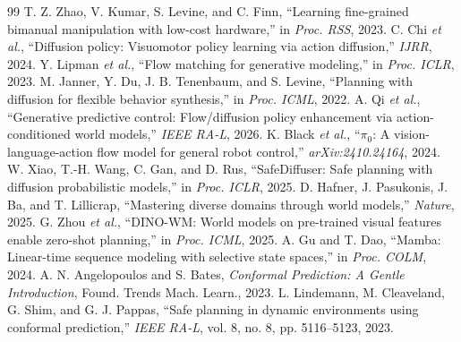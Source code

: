\documentclass[letterpaper, 10pt, conference]{ieeeconf}
\begin{document}
\begin{thebibliography}{99}
 T. Z. Zhao, V. Kumar, S. Levine, and C. Finn, ``Learning fine-grained bimanual manipulation with low-cost hardware,'' in \textit{Proc. RSS}, 2023.
 C. Chi \textit{et al.}, ``Diffusion policy: Visuomotor policy learning via action diffusion,'' \textit{IJRR}, 2024.
 Y. Lipman \textit{et al.}, ``Flow matching for generative modeling,'' in \textit{Proc. ICLR}, 2023.
 M. Janner, Y. Du, J. B. Tenenbaum, and S. Levine, ``Planning with diffusion for flexible behavior synthesis,'' in \textit{Proc. ICML}, 2022.
 A. Qi \textit{et al.}, ``Generative predictive control: Flow/diffusion policy enhancement via action-conditioned world models,'' \textit{IEEE RA-L}, 2026.
 K. Black \textit{et al.}, ``$\pi_0$: A vision-language-action flow model for general robot control,'' \textit{arXiv:2410.24164}, 2024.
 W. Xiao, T.-H. Wang, C. Gan, and D. Rus, ``SafeDiffuser: Safe planning with diffusion probabilistic models,'' in \textit{Proc. ICLR}, 2025.
 D. Hafner, J. Pasukonis, J. Ba, and T. Lillicrap, ``Mastering diverse domains through world models,'' \textit{Nature}, 2025.
 G. Zhou \textit{et al.}, ``DINO-WM: World models on pre-trained visual features enable zero-shot planning,'' in \textit{Proc. ICML}, 2025.
 A. Gu and T. Dao, ``Mamba: Linear-time sequence modeling with selective state spaces,'' in \textit{Proc. COLM}, 2024.
 A. N. Angelopoulos and S. Bates, \textit{Conformal Prediction: A Gentle Introduction}, Found. Trends Mach. Learn., 2023.
 L. Lindemann, M. Cleaveland, G. Shim, and G. J. Pappas, ``Safe planning in dynamic environments using conformal prediction,'' \textit{IEEE RA-L}, vol. 8, no. 8, pp. 5116--5123, 2023.
\end{thebibliography}
\end{document}
